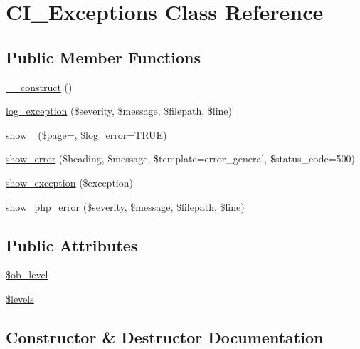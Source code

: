 \hypertarget{class_c_i___exceptions}{}\section{C\+I\+\_\+\+Exceptions Class Reference}
\label{class_c_i___exceptions}
\subsection*{Public Member Functions}
\begin{DoxyCompactItemize}
\item 
\mbox{\hyperlink{class_c_i___exceptions_a095c5d389db211932136b53f25f39685}{\+\_\+\+\_\+construct}} ()
\item 
\mbox{\hyperlink{class_c_i___exceptions_a477bd3360509887aeb6e0a56bcdcad2a}{log\+\_\+exception}} (\$severity, \$message, \$filepath, \$line)
\item 
\mbox{\hyperlink{class_c_i___exceptions_aaee13338b10f986f23d77eabcaf40fec}{show\+\_}} (\$page=\textquotesingle{}\textquotesingle{}, \$log\+\_\+error=T\+R\+UE)
\item 
\mbox{\hyperlink{class_c_i___exceptions_a4214456af4ed4c4d7a292939dea95257}{show\+\_\+error}} (\$heading, \$message, \$template=\textquotesingle{}error\+\_\+general\textquotesingle{}, \$status\+\_\+code=500)
\item 
\mbox{\hyperlink{class_c_i___exceptions_a6ad5ac9b245835caf69b6d3de1f48a85}{show\+\_\+exception}} (\$exception)
\item 
\mbox{\hyperlink{class_c_i___exceptions_a7962c30cacf1341dac1c44d8ab57cebe}{show\+\_\+php\+\_\+error}} (\$severity, \$message, \$filepath, \$line)
\end{DoxyCompactItemize}
\subsection*{Public Attributes}
\begin{DoxyCompactItemize}
\item 
\mbox{\hyperlink{class_c_i___exceptions_abb6b6587dbaf0238bf26829c8df05d59}{\$ob\+\_\+level}}
\item 
\mbox{\hyperlink{class_c_i___exceptions_a1035dc0448354cc79f8f9e1ca8dfd0cb}{\$levels}}
\end{DoxyCompactItemize}


\subsection{Constructor \& Destructor Documentation}
\mbox{\label{class_c_i___exceptions_a095c5d389db211932136b53f25f39685}} 
